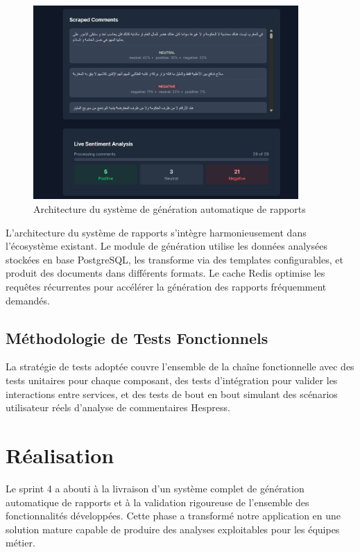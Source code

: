 \begin{figure}[H]
\centering
\includegraphics[width=0.9\textwidth]{assets/images/report-ui.png}
\caption{Architecture du système de génération automatique de rapports}
\label{fig:reports-architecture}
\end{figure}

L'architecture du système de rapports s'intègre harmonieusement dans l'écosystème existant. Le module de génération utilise les données analysées stockées en base PostgreSQL, les transforme via des templates configurables, et produit des documents dans différents formats. Le cache Redis optimise les requêtes récurrentes pour accélérer la génération des rapports fréquemment demandés.

\subsection{Méthodologie de Tests Fonctionnels}


La stratégie de tests adoptée couvre l'ensemble de la chaîne fonctionnelle avec des tests unitaires pour chaque composant, des tests d'intégration pour valider les interactions entre services, et des tests de bout en bout simulant des scénarios utilisateur réels d'analyse de commentaires Hespress.

\section{Réalisation}

Le sprint 4 a abouti à la livraison d'un système complet de génération automatique de rapports et à la validation rigoureuse de l'ensemble des fonctionnalités développées. Cette phase a transformé notre application en une solution mature capable de produire des analyses exploitables pour les équipes métier.

